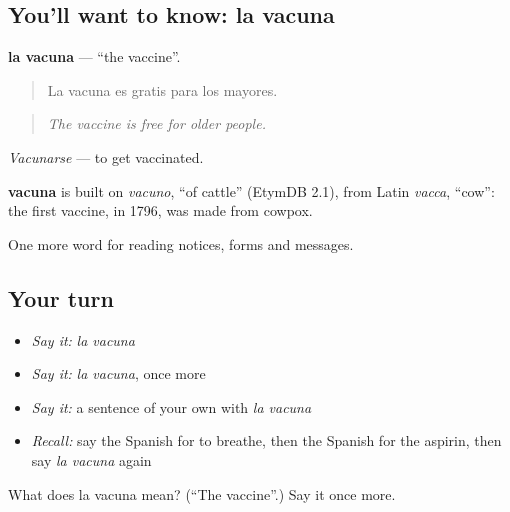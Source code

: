 \subsection*{You'll want to know: la vacuna}
\textbf{la vacuna} — \textquotedblleft{}the vaccine\textquotedblright{}.

\begin{quote}
La vacuna es gratis para los mayores.
\end{quote}

\begin{quote}
\emph{The vaccine is free for older people.}
\end{quote}

\emph{Vacunarse} — to get vaccinated.

\begin{cousinweb}
\textbf{vacuna} is built on \emph{vacuno}, \textquotedblleft{}of cattle\textquotedblright{} (EtymDB 2.1), from Latin \emph{vacca}, \textquotedblleft{}cow\textquotedblright{}: the first vaccine, in 1796, was made from cowpox.
\end{cousinweb}

\begin{grammarlens}[title={What you've built}]
One more word for reading notices, forms and messages.
\end{grammarlens}

\subsection*{Your turn}
\begin{itemize}
\raggedright
  \item \emph{Say it:} \emph{la vacuna}
  \item \emph{Say it:} \emph{la vacuna}, once more
  \item \emph{Say it:} a sentence of your own with \emph{la vacuna}
  \item \emph{Recall:} say the Spanish for to breathe, then the Spanish for the aspirin, then say \emph{la vacuna} again
\end{itemize}

\begin{tcolorbox}[breakable,colback=teal!4,colframe=teal!35!black,title={Before you move on}]
What does la vacuna mean? (\textquotedblleft{}The vaccine\textquotedblright{}.) Say it once more.
\end{tcolorbox}
